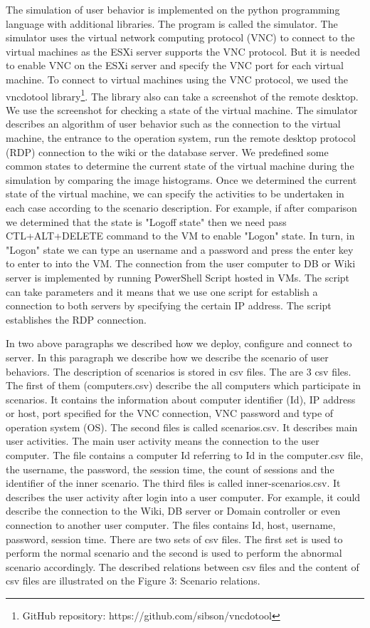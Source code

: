 The simulation of user behavior is implemented on the python programming language with additional libraries. The program is called the simulator. The simulator uses the virtual network computing protocol (VNC) to connect to the virtual machines as the ESXi server supports the VNC protocol. But it is needed to enable VNC on the ESXi server and specify the VNC port for each virtual machine. To connect to virtual machines using the VNC protocol, we used the vncdotool library\footnote{GitHub repository: https://github.com/sibson/vncdotool}. The library also can take a screenshot of the remote desktop. We use the screenshot for checking a state of the virtual machine. The simulator describes an algorithm of user behavior such as the connection to the virtual machine, the entrance to the operation system, run the remote desktop protocol (RDP) connection to the wiki or the database server. We predefined some common states to determine the current state of the virtual machine during the simulation by comparing the image histograms. Once we determined the current state of the virtual machine, we can specify the activities to be undertaken in each case according to the scenario description. For example, if after comparison we determined that the state is "Logoff state" then we need pass CTL+ALT+DELETE command to the VM to enable "Logon" state. In turn, in "Logon" state we can type an username and a password and press the enter key to enter to into the VM. The connection from the user computer to DB or Wiki server is implemented by running PowerShell Script hosted in VMs. The script can take parameters and it means that we use one script for establish a connection to both servers by specifying the certain IP address. The script establishes the RDP connection. 

In two above paragraphs we described how we deploy, configure and connect to server. In this paragraph we describe how we describe the scenario of user behaviors. The description of scenarios is stored in csv files. The are 3 csv files. The first of them (computers.csv) describe the all computers which participate in scenarios. It contains the information about computer identifier (Id), IP address or host, port specified for the VNC connection, VNC password and type of operation system (OS).
The second files is called scenarios.csv. It describes main user activities. The main user activity means the connection to the user computer. The file contains a computer Id referring to Id in the computer.csv file, the username, the password, the session time, the count of sessions and the identifier of the inner scenario. The third files is called inner-scenarios.csv. It describes the user activity after login into a user computer. For example, it could describe the connection to the Wiki, DB server or Domain controller or even connection to another user computer. The files contains Id, host, username, password, session time. There are two sets of csv files. The first set is used to perform the normal scenario and the second is used to perform the abnormal scenario accordingly. The described relations between csv files and the content of csv files are illustrated on the Figure 3: Scenario relations.
 	
